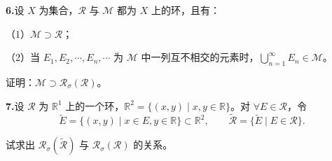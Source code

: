 \documentclass[11pt,a4paper]{article}
\begin{document}
\par{}\noindent\textbf{6.}\quad 设 $X$ 为集合，$\mathcal R$ 与 $\mathcal M$ 都为 $X$ 上的环，且有：
\par\noindent （1）$\mathcal M\supset\mathcal R$；
\par\noindent （2）当 $E_1,E_2,\cdots,E_n,\cdots$ 为 $\mathcal M$ 中一列互不相交的元素时，$\bigcup_{n=1}^\infty E_n\in\mathcal M$。
\par\noindent 证明：$\mathcal M\supset\mathcal R_\sigma(\mathcal R)$。
\par{}\noindent\textbf{7.}\quad 设 $\mathcal R$ 为 $\mathbb R^1$ 上的一个环，$\mathbb R^2=\{(x,y)\mid x,y\in\mathbb R\}$。对 $\forall E\in\mathcal R$，令
\[\widetilde E=\{(x,y)\mid x\in E,y\in\mathbb R\}\subset\mathbb R^2,\qquad \widetilde{\mathcal R}=\{\widetilde E\mid E\in\mathcal R\}.\]
\par\noindent 试求出 $\mathcal R_\sigma(\widetilde{\mathcal R})$ 与 $\mathcal R_\sigma(\mathcal R)$ 的关系。
\end{document}
